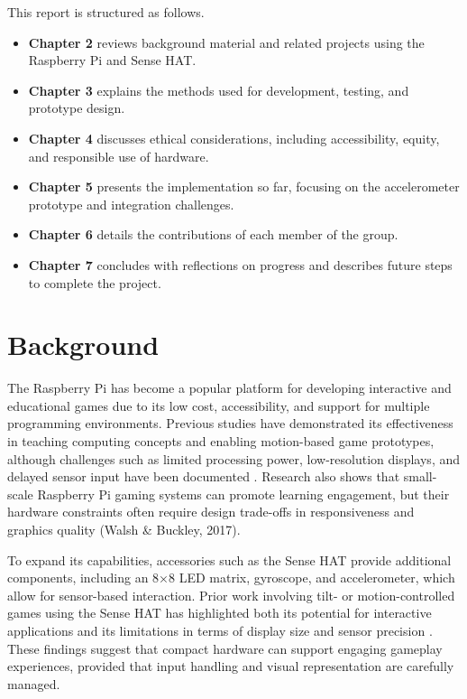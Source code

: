 \documentclass[12pt]{report}
\begin{document}
\label{sec:thesis-outline}

This report is structured as follows.

\begin{itemize}
    \item \textbf{Chapter 2} reviews background material and related projects using the Raspberry Pi and Sense HAT.
    \item \textbf{Chapter 3} explains the methods used for development, testing, and prototype design.
    \item \textbf{Chapter 4} discusses ethical considerations, including accessibility, equity, and responsible use of hardware.
    \item \textbf{Chapter 5} presents the implementation so far, focusing on the accelerometer prototype and integration challenges.
    \item \textbf{Chapter 6} details the contributions of each member of the group.
    \item \textbf{Chapter 7} concludes with reflections on progress and describes future steps to complete the project.
\end{itemize}
\chapter{Background}
\label{cha:background}

  The Raspberry Pi has become a popular platform for developing interactive and educational games due to its low cost, accessibility, and support for multiple programming environments. Previous studies have demonstrated its effectiveness in teaching computing concepts and enabling motion-based game prototypes, although challenges such as limited processing power, low-resolution displays, and delayed sensor input have been documented \cite{Kolling2016}. Research also shows that small-scale Raspberry Pi gaming systems can promote learning engagement, but their hardware constraints often require design trade-offs in responsiveness and graphics quality (Walsh & Buckley, 2017).

To expand its capabilities, accessories such as the Sense HAT provide additional components, including an 8×8 LED matrix, gyroscope, and accelerometer, which allow for sensor-based interaction. Prior work involving tilt- or motion-controlled games using the Sense HAT has highlighted both its potential for interactive applications and its limitations in terms of display size and sensor precision \cite{Saha2016}. These findings suggest that compact hardware can support engaging gameplay experiences, provided that input handling and visual representation are carefully managed.
\end{document}
